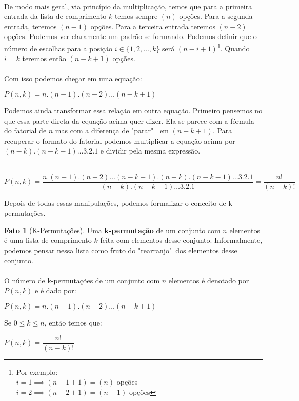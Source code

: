 \documentclass[a4paper,11pt]{book}
\theoremstyle{definition}
\theoremstyle{break}
\newtheorem{fact}{Fato}[section]
\begin{document}
\\
De modo mais geral, via princípio da multiplicação, temos que para a primeira entrada da lista de comprimento $k$ temos sempre $(n)$ opções. Para a segunda entrada, teremos $(n - 1)$ opções. Para a terceira entrada teremos $(n - 2)$ opções. Podemos ver claramente um padrão se formando. Podemos definir que o número de escolhas para a posição $i \in \{1,2,\dots,k\}$ será $(n - i + 1)$\footnote{Por exemplo: \\ $i = 1 \implies (n - 1 + 1) = (n)$ opções \\ $i = 2 \implies (n - 2 + 1) = (n - 1)$ opções}. Quando $i = k$ teremos então $(n - k + 1)$ opções.
\\
\\
Com isso podemos chegar em uma equação:
\begin{center}
$ P(n,k) = n . (n - 1) . (n - 2) \dots (n - k + 1) $
\end{center}

Podemos ainda transformar essa relação em outra equação. Primeiro pensemos no que essa parte direta da equação acima quer dizer. Ela se parece com a fórmula do fatorial de $n$ mas com a diferença de "parar" \ em $(n - k + 1)$. Para recuperar o formato do fatorial podemos multiplicar a equação acima por $ (n - k) . (n - k - 1) \dots 3 . 2 . 1 $ e dividir pela mesma expressão.
\ 
\\
\ 
\\

\begin{center}
\small $ P(n,k) = \dfrac{n . (n - 1) . (n - 2) \dots (n - k + 1) . (n - k) . (n - k - 1) \dots 3 . 2 . 1}{(n - k) . (n - k - 1) \dots 3 . 2 . 1} = \dfrac{n!}{(n-k)!}$
\end{center}

Depois de todas essas manipulações, podemos formalizar o conceito de k-permutações.

\begin{fact}[K-Permutações]
Uma \textbf{k-permutação} de um conjunto com $n$ elementos é uma lista de comprimento $k$ feita com elementos desse conjunto. Informalmente, podemos pensar nessa lista como fruto do "rearranjo"\ dos elementos desse conjunto.
\\
\\
O número de k-permutações de um conjunto com $n$ elementos é denotado por $P(n,k)$ e é dado por:\\
\begin{center}
$ P(n,k) = n . (n - 1) . (n - 2) \dots (n - k + 1) $
\end{center}

Se $0 \leq k \leq n$, então temos que:\\
\begin{center}
 $ P(n,k) = \dfrac{n!}{(n - k)!} $
\end{center}
\end{fact}
\end{document}
